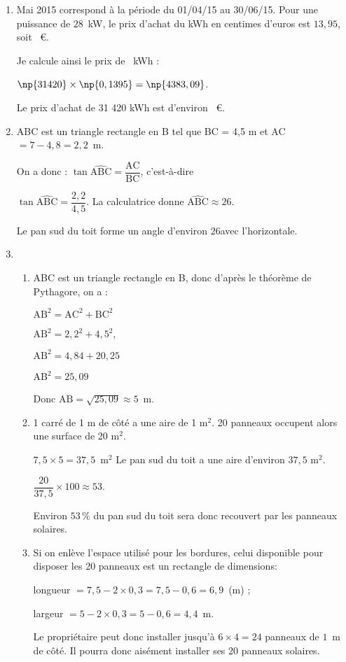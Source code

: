 
\medskip

\begin{enumerate}
\item Mai 2015 correspond à la période du 01/04/15 au 30/06/15. Pour une
puissance de $28$~kW, le prix d'achat du kWh en centimes d'euros est $13,95$, soit
 ~\euro. 

Je calcule ainsi le prix de ~kWh :

$\np{31420} \times \np{0,1395} = \np{4383,09}$.

Le prix d'achat de 31 420 kWh est d'environ ~\euro.
\item  ABC est un triangle rectangle en B tel que
BC = 4,5 m et AC $= 7  - 4,8  = 2,2$~m.

On a donc : $\tan \widehat{\text{ABC}} = \dfrac{\text{AC}}{\text{BC}}$, c'est-à-dire

$\tan \widehat{\text{ABC}} = \dfrac{2,2}{4,5}$. La calculatrice donne $\widehat{\text{ABC}} \approx  26$\degres.

Le pan sud du toit forme un angle d'environ 26\degres avec l'horizontale.
\item 
	\begin{enumerate}
		\item ABC est un triangle rectangle en B, donc d'après le théorème de
Pythagore, on a :
		
$\text{AB}^2 = \text{AC}^2 + \text{BC}^2$
		
$\text{AB}^2 = 2,2^2 + 4,5^2,$
		
$\text{AB}^2 = 4,84 + 20,25$
		
$\text{AB}^2 = 25,09$
		
Donc $\text{AB} = \sqrt{25,09} \approx  5$~m.
		\item 1 carré de 1 m de côté a une aire de 1 m$^2$. 20 panneaux occupent alors une
surface de 20 m$^2$.
		
$7,5  \times 5  = 37,5$~m$^2$ Le pan sud du toit a une aire d'environ $37,5$ m$^2$.
		
$\dfrac{20}{37,5} \times 100 \approx 53$.

Environ $53\,\%$ du pan sud du toit sera donc recouvert par les panneaux solaires.
		\item Si on enlève l'espace utilisé pour les bordures, celui disponible pour disposer
les 20 panneaux est un rectangle de dimensions:
		
longueur $= 7,5  - 2 \times 0,3  = 7,5  - 0,6 = 6,9$~(m) ;
		
largeur $= 5 - 2 \times 0,3= 5 - 0,6 = 4,4$~m.
		
Le propriétaire peut donc installer jusqu'à $6 \times 4 = 24$ panneaux de $1$~m de côté. Il
pourra donc aisément installer ses $20$ panneaux solaires.
 	\end{enumerate}
\end{enumerate}

\bigskip

